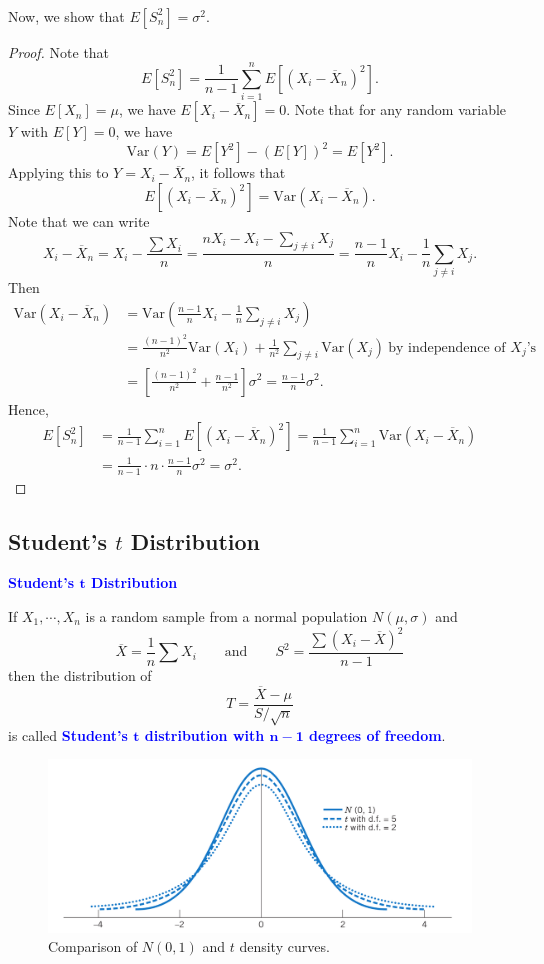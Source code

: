 \documentclass[12pt,a4paper]{article}
\newcommand{\Var}{\text{Var}}
\begin{document}
\\ Now, we show that $E[S_n^2]=\sigma^2$. \begin{proof}
	Note that \[
		E[S_n^2]=\frac{1}{n-1}\sum_{i=1}^nE[(X_i-\overline{X}_n)^2].
	\] Since $E[X_n]=\mu$, we have $E[X_i-\overline{X}_n]=0$. Note that for any random variable $Y$ with $E[Y]=0$, we have \[
	\Var(Y)=E[Y^2]-(E[Y])^2=E[Y^2].
	\] Applying this to $Y=X_i-\overline{X}_n$, it follows that \[
	E[(X_i-\overline{X}_n)^2] = \Var(X_i-\overline{X}_n).
	\] Note that we can write \[
	X_i-\overline{X}_n=X_i-\frac{\sum X_i}{n} = \frac{nX_i-X_i-\sum_{j\neq i}X_j}{n}=\frac{n-1}{n}X_i-\frac{1}{n}\sum_{j\neq i}X_j.
	\] Then \begin{align*}
		\Var(X_i-\overline{X}_n) &= \Var\left(\frac{n-1}{n}X_i-\frac{1}{n}\sum_{j\neq i}X_j\right) \\
		&= \frac{(n-1)^2}{n^2}\Var(X_i)+\frac{1}{n^2}\sum_{j\neq i}\Var(X_j)\ \text{by independence of $X_j$'s} \\
		&= \left[\frac{(n-1)^2}{n^2}+\frac{n-1}{n^2}\right]\sigma^2=\frac{n-1}{n}\sigma^2.
	\end{align*} Hence, \begin{align*}
	E[S_n^2] &= \frac{1}{n-1}\sum_{i=1}^nE[(X_i-\overline{X}_n)^2]= \frac{1}{n-1}\sum_{i=1}^n\Var(X_i-\overline{X}_n) \\
	&= \frac{1}{n-1}\cdot n\cdot \frac{n-1}{n}\sigma^2=\sigma^2.
	\end{align*}
\end{proof}

\subsection{Student's $t$ Distribution}
\begin{tcolorbox}[colback=white]\begin{center}
		\textcolor{blue}{\bf Student's $\boldsymbol{t}$ Distribution}
	\end{center}
	If $X_1,\cdots,X_n$ is a random sample from a normal population $N(\mu,\sigma)$ and \[
	\overline{X}=\frac{1}{n}\sum X_i\qquad\text{and}\qquad S^2=\frac{\sum(X_i-\overline{X})^2}{n-1}
	\] then the distribution of \[
	T=\frac{\overline{X}-\mu}{S/\sqrt{n}}
	\] is called \textcolor{blue}{\bf Student's $\boldsymbol{t}$ distribution with $\boldsymbol{n-1}$ degrees of freedom}.
\end{tcolorbox}\begin{figure}[h!]
\centering
\includegraphics[scale=.28]{t_distribution.png}
\caption{Comparison of $N(0,1)$ and $t$ density curves.}
\end{figure}
\end{document}
